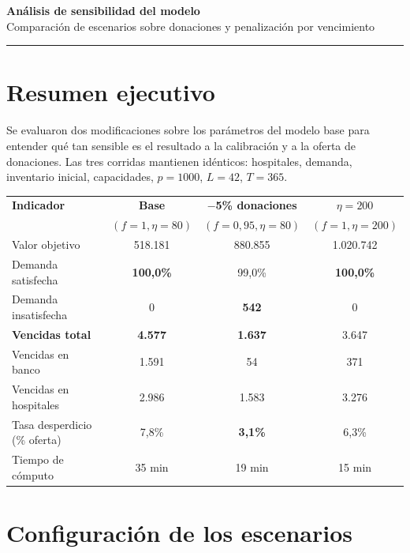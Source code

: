 \documentclass[11pt, a4paper]{article}
\begin{document}
\begin{center}
  {\LARGE\bfseries\color{ucblue} Análisis de sensibilidad del modelo}\\[3pt]
  {\normalsize Comparación de escenarios sobre donaciones y penalización por vencimiento}
\end{center}
\vspace{-2pt}
{\color{ucblue}\rule{\linewidth}{1.5pt}}

\section{Resumen ejecutivo}

Se evaluaron dos modificaciones sobre los parámetros del modelo base para entender qué tan sensible es el resultado a la calibración y a la oferta de donaciones. Las tres corridas mantienen idénticos: hospitales, demanda, inventario inicial, capacidades, $p = 1000$, $L = 42$, $T = 365$.

\begin{center}
\begin{tabular}{lccc}
\toprule
\rowcolor{rowgray}\textbf{Indicador} & \textbf{Base} & \textbf{$-$5\% donaciones} & \textbf{$\eta = 200$}\\
\rowcolor{rowgray} & $(f{=}1, \eta{=}80)$ & $(f{=}0{,}95, \eta{=}80)$ & $(f{=}1, \eta{=}200)$\\
\midrule
Valor objetivo & 518.181 & 880.855 & 1.020.742 \\
Demanda satisfecha & \textbf{\color{accentgreen}100,0\%} & 99,0\% & \textbf{\color{accentgreen}100,0\%} \\
Demanda insatisfecha & 0 & \textbf{\color{accentred}542} & 0 \\
\textbf{Vencidas total} & \textbf{4.577} & \textbf{\color{accentgreen}1.637} & 3.647 \\
\quad Vencidas en banco & 1.591 & 54 & 371 \\
\quad Vencidas en hospitales & 2.986 & 1.583 & 3.276 \\
Tasa desperdicio (\% oferta) & 7,8\% & \textbf{\color{accentgreen}3,1\%} & 6,3\% \\
Tiempo de cómputo & 35 min & 19 min & 15 min \\
\bottomrule
\end{tabular}
\end{center}

\section{Configuración de los escenarios}
\end{document}
